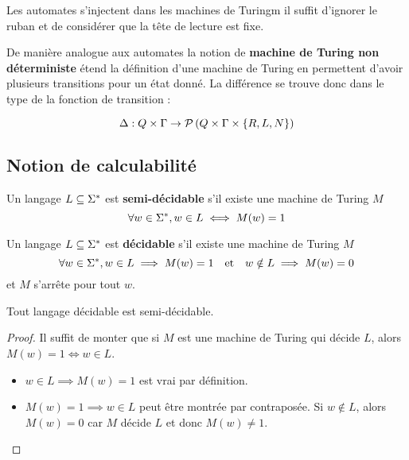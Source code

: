 \documentclass{article}
\begin{document}
\begin{remarque}
	Les automates s'injectent dans les machines de Turingm il suffit d'ignorer le ruban et de considérer que la tête de lecture est fixe.
\end{remarque}

\begin{definition}
	De manière analogue aux automates la notion de \textbf{machine de Turing non déterministe} étend la définition d'une machine de Turing en
	permettent d'avoir plusieurs transitions pour un état donné. La différence se trouve donc dans le type de la fonction de transition :

	$$ \Delta: Q \times \Gamma \to \mathcal{P}\left(Q \times \Gamma \times \{R, L, N\}\right)$$

\end{definition}


\subsection{Notion de calculabilité}


\begin{definition}
	Un langage $L \subseteq \Sigma^{*}$ est \textbf{semi-décidable} s'il existe une machine de Turing $M$ \tlq
	$$ \forall w \in \Sigma^{*}, w \in L \iff M(w) = 1 $$
\end{definition}

\begin{definition}
	Un langage $L \subseteq \Sigma^{*}$ est \textbf{décidable} s'il existe une machine de Turing $M$ \tlq
	$$ \forall w \in \Sigma^{*}, w \in L \implies M(w) = 1 \quad \text{et} \quad w \notin L \implies M(w) = 0 $$
	et $M$ s'arrête pour tout $w$.
\end{definition}

\begin{prop}
	Tout langage décidable est semi-décidable.
\end{prop}

\begin{proof}
	Il suffit de monter que si $M$ est une machine de Turing qui décide $L$, alors $M(w) = 1 \iff w \in L$.
	\begin{itemize}
		\item $w \in L \implies M(w) = 1$ est vrai par définition.
		\item $M(w) = 1 \implies w \in L$ peut être montrée par contraposée. Si $w \notin L$, alors $M(w) = 0$ car $M$ décide $L$ et donc $M(w) \neq 1$.
	\end{itemize}
\end{proof}
\end{document}
